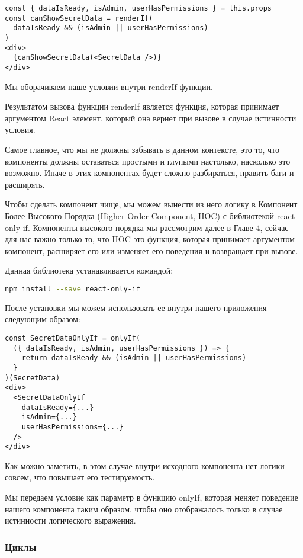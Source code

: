 \begin{lstlisting}
const { dataIsReady, isAdmin, userHasPermissions } = this.props
const canShowSecretData = renderIf(
  dataIsReady && (isAdmin || userHasPermissions)
)
<div>
  {canShowSecretData(<SecretData />)}
</div>
\end{lstlisting}


Мы оборачиваем наше условии внутри renderIf функции.

Результатом вызова функции renderIf является функция, которая принимает аргументом React элемент, который она вернет при вызове в случае истинности условия.

Самое главное, что мы не должны забывать в данном контексте, это то, что компоненты должны оставаться простыми и глупыми настолько, насколько это возможно. Иначе в этих компонентах будет сложно разбираться, править баги и расширять.

Чтобы сделать компонент чище, мы можем вынести из него логику в Компонент Более Высокого Порядка (Higher-Order Component, HOC) с библиотекой react-only-if. Компоненты высокого порядка мы рассмотрим далее в Главе 4, сейчас для нас важно только то, что HOC это функция, которая принимает аргументом компонент, расширяет его или изменяет его поведения и возвращает при вызове.

Данная библиотека устанавливается командой:

\begin{lstlisting}[language=bash]
npm install --save react-only-if
\end{lstlisting}

После установки мы можем использовать ее внутри нашего приложения следующим образом:

\begin{lstlisting}
const SecretDataOnlyIf = onlyIf(
  ({ dataIsReady, isAdmin, userHasPermissions }) => {
    return dataIsReady && (isAdmin || userHasPermissions)
  }
)(SecretData)
<div>
  <SecretDataOnlyIf
    dataIsReady={...}
    isAdmin={...}
    userHasPermissions={...}
  /> 
</div>
\end{lstlisting}

Как можно заметить, в этом случае внутри исходного компонента нет логики совсем, что повышает его тестируемость.

Мы передаем условие как параметр в функцию onlyIf, которая меняет поведение нашего компонента таким образом, чтобы оно отображалось только в случае истинности логического выражения.

\subsubsection{Циклы}

